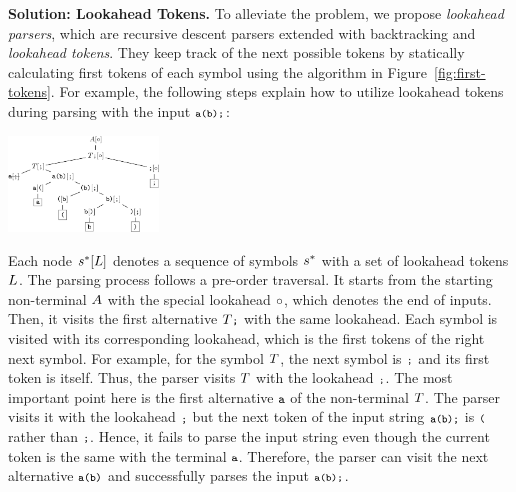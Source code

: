 \textbf{Solution: Lookahead Tokens.}
To alleviate the problem, we propose \textit{lookahead parsers},
which are recursive descent parsers extended with backtracking and
\textit{lookahead tokens}.  They keep track of the next possible
tokens by statically calculating first tokens of each symbol using the
algorithm in Figure~\ref{fig:first-tokens}.  For example, the
following steps explain how to utilize lookahead tokens during parsing
with the input \( \texttt{\footnotesize a(b);} \):
\begin{center}
  \includegraphics[width=0.3\textwidth]{img/laparser.png}
\end{center}
Each node \( s^*[L] \) denotes a sequence of symbols \( s^* \)
with a set of lookahead tokens \( L \).  The parsing process follows
a pre-order traversal.  It starts from the starting non-terminal \( A \)
with the special lookahead \( \circ \), which denotes the end of
inputs.  Then, it visits the first alternative \( T \texttt{\footnotesize;} \) with
the same lookahead.  Each symbol is visited with its corresponding
lookahead, which is the first tokens of the right next symbol.
For example, for the symbol \( T \), the next symbol is \( \texttt{\footnotesize;} \)
and its first token is itself.  Thus, the parser visits \( T \)
with the lookahead \( \texttt{\footnotesize;} \).  The most important point here
is the first alternative \( \texttt{\footnotesize a} \) of the
non-terminal \( T \).  The parser visits it with the lookahead \( \texttt{\footnotesize;} \)
but the next token of the input string \( \texttt{\footnotesize a(b);} \) is \( \texttt{\footnotesize(} \)
rather than \( \texttt{\footnotesize;} \).  Hence, it fails to parse the input string
even though the current token is the same with the terminal \( \texttt{\footnotesize a} \).
Therefore, the parser can visit the next alternative \( \texttt{\footnotesize a}\texttt{\footnotesize(}\texttt{\footnotesize b}\texttt{\footnotesize)} \)
and successfully parses the input \( \texttt{\footnotesize a(b);} \).

